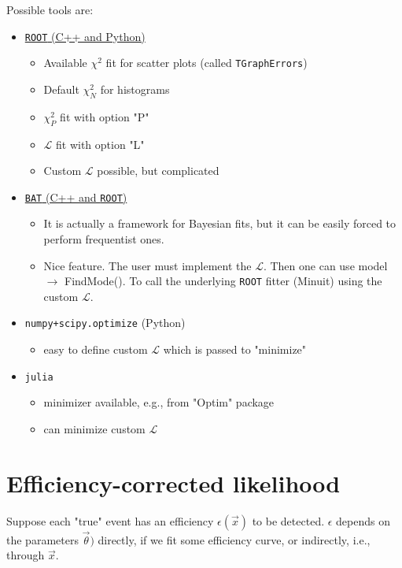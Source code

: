 Possible tools are: 
\begin{itemize}[$\to$]
    \item \href{https://root.cern/}{\texttt{ROOT} (C++ and Python)}
    \begin{itemize}[$\to$]
        \item Available $\chi^2$ fit for scatter plots (called \texttt{TGraphErrors})
        \item Default $\chi_N^2$ for histograms
        \item $\chi_P^2$ fit with option "P"
        \item $\mathcal{L}$ fit with option "L"
        \item Custom $\mathcal{L}$ possible, but complicated
    \end{itemize}
    \item \href{https://github.com/bat/bat}{\texttt{BAT} (C++ and \texttt{ROOT})}
    \begin{itemize}[$\to$]
        \item It is actually a framework for Bayesian fits, but it can be easily forced to perform frequentist ones. 
        \item Nice feature. The user must implement the $\mathcal{L}$. Then one can use model $\rightarrow$ FindMode(). To call the underlying \texttt{ROOT} fitter (Minuit) using the custom $\mathcal{L}$.
    \end{itemize}
    \item \texttt{numpy+scipy.optimize} (Python)
    \begin{itemize}[$\to$]
        \item easy to define custom $\mathcal{L}$ which is passed to "minimize"
    \end{itemize}
    \item \texttt{julia}
    \begin{itemize}[$\to$]
        \item minimizer available, e.g., from "Optim" package
        \item can minimize custom $\mathcal{L}$
    \end{itemize}
\end{itemize}

\section{Efficiency-corrected likelihood} \label{efficiency_corrected_likelihood}
Suppose each "true" event has an efficiency $\epsilon(\vec{x})$ to be detected. $\epsilon$ depends on the parameters $\vec{\theta})$ directly, if we fit some efficiency curve, or indirectly, i.e., through $\vec{x}$.

